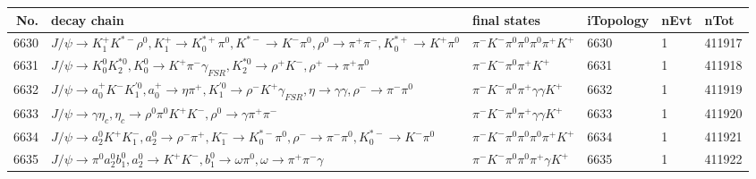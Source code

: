 \begin{table}[htbp] 
\begin{center}
\begin{small}
\begin{tabular}{rlllll}\hline\hline
 No. & decay chain & final states &  iTopology & nEvt & nTot \\\hline
6630&$J/\psi       \rightarrow K_1^{+}        K^{*-}         \rho^{0}      , K_1^{+}         \rightarrow K_{0}^{*+}     \pi^{0}        , K^{*-}          \rightarrow K^{-}          \pi^{0}        , \rho^{0}       \rightarrow \pi^{+}        \pi^{-}        , K_{0}^{*+}      \rightarrow K^{+}          \pi^{0}        $&$\pi^{-}        K^{-}          \pi^{0}        \pi^{0}        \pi^{0}        \pi^{+}        K^{+}          $& 6630&    1&411917\\
6631&$J/\psi       \rightarrow K_0^{0}        K_2^{*0}       , K_0^{0}         \rightarrow K^{+}          \pi^{-}        \gamma_{FSR} , K_2^{*0}        \rightarrow \rho^{+}      K^{-}          , \rho^{+}       \rightarrow \pi^{+}        \pi^{0}        $&$\pi^{-}        K^{-}          \pi^{0}        \pi^{+}        K^{+}          $& 6631&    1&411918\\
6632&$J/\psi       \rightarrow a_{0}^{+}      K^{-}          K_1^{'0}      , a_{0}^{+}       \rightarrow \eta          \pi^{+}        , K_1^{'0}       \rightarrow \rho^{-}      K^{+}          \gamma_{FSR} , \eta           \rightarrow \gamma       \gamma       , \rho^{-}       \rightarrow \pi^{-}        \pi^{0}        $&$\pi^{-}        K^{-}          \pi^{0}        \pi^{+}        \gamma       \gamma       K^{+}          $& 6632&    1&411919\\
6633&$J/\psi       \rightarrow \gamma       \eta_{c}    , \eta_{c}     \rightarrow \rho^{0}      \pi^{0}        K^{+}          K^{-}          , \rho^{0}       \rightarrow \gamma       \pi^{+}        \pi^{-}        $&$\pi^{-}        K^{-}          \pi^{0}        \pi^{+}        \gamma       \gamma       K^{+}          $& 6633&    1&411920\\
6634&$J/\psi       \rightarrow a_{2}^{0}      K^{+}          K_{1}^{-}      , a_{2}^{0}       \rightarrow \rho^{-}      \pi^{+}        , K_{1}^{-}       \rightarrow K_{0}^{*-}     \pi^{0}        , \rho^{-}       \rightarrow \pi^{-}        \pi^{0}        , K_{0}^{*-}      \rightarrow K^{-}          \pi^{0}        $&$\pi^{-}        K^{-}          \pi^{0}        \pi^{0}        \pi^{0}        \pi^{+}        K^{+}          $& 6634&    1&411921\\
6635&$J/\psi       \rightarrow \pi^{0}        a_{2}^{0}      b_{1}^{0}      , a_{2}^{0}       \rightarrow K^{+}          K^{-}          , b_{1}^{0}       \rightarrow \omega         \pi^{0}        , \omega          \rightarrow \pi^{+}        \pi^{-}        \gamma       $&$\pi^{-}        K^{-}          \pi^{0}        \pi^{0}        \pi^{+}        \gamma       K^{+}          $& 6635&    1&411922\\

\end{tabular}
\end{small}
\end{center}
\end{table}
